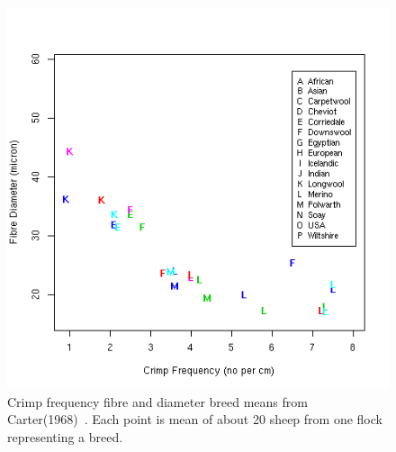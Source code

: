 %

\begin{figure}[]
\centering
    \includegraphics[scale=0.80]{cartercrimpdia.png}
  \caption{Crimp frequency fibre and diameter breed means from Carter(1968)~\cite{carter-1968}. Each point is mean of about 20 sheep from one flock representing a breed.}
\vfill
  \label{fig:cartcrimpdia}
\end{figure}

%

